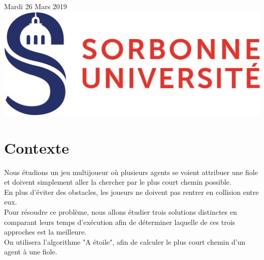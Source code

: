 \documentclass{article}
\begin{document}
\begin{titlepage}

{\large Mardi 26 Mars 2019}\\[3cm] %


\includegraphics[scale=0.15]{logo_sorbonne.PNG} %
 

\vfill %

\end{titlepage}

\newpage
\renewcommand{\contentsname}{\center{Table des Matières}\vspace*{5cm}}

\tableofcontents

\newpage


\section{Contexte}
	Nous étudions un jeu multijoueur où plusieurs agents se voient attribuer une fiole et doivent simplement aller la chercher par le plus court chemin possible.\\
En plus d'éviter des obstacles, les joueurs ne doivent pas rentrer en collision entre eux. \\
Pour résoudre ce problème, nous allons étudier trois solutions distinctes en comparant leurs temps d'exécution afin de déterminer laquelle de ces trois approches est la meilleure.\\
On utilisera l'algorithme "A étoile", afin de calculer le plus court chemin d'un agent à une fiole.
\end{document}
